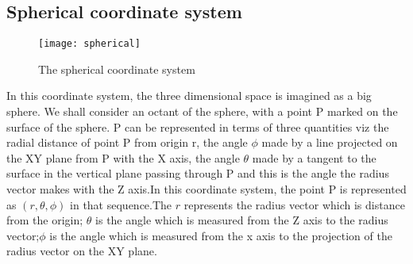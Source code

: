 	 \subsection{Spherical coordinate system}
	 \begin{figure}[h]
	 	\centering
	 	\texttt{[image: spherical]}
	 	\caption{The spherical  coordinate system}
	 \end{figure}
	 In this coordinate system, the three dimensional space is imagined as a big sphere. We shall consider an octant of the sphere, with a point P marked on the surface of the sphere. P can be represented in terms of three quantities viz the radial distance of point P from origin r, the angle $\phi$ made by a line projected on the XY plane from P with the X axis, the angle $\theta$ made by a tangent to the surface in the vertical plane passing through P and this is the angle the radius vector makes with the Z axis.In this coordinate system, the point P is represented as $(r,\theta, \phi)$ in that sequence.The $r$ represents the radius vector which is distance from the origin; $\theta$ is the angle which is measured from the Z axis to the radius vector;$\phi$ is the angle which is measured from the x axis to the projection of the radius vector on the XY plane.
	 
